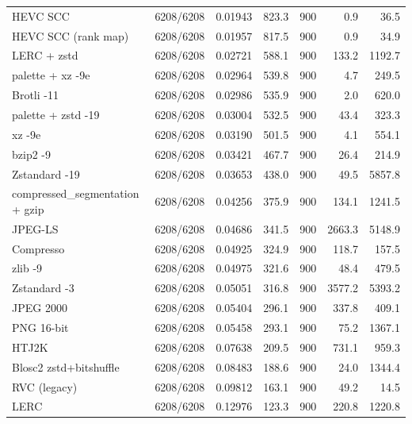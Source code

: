 \begin{table}[t]
\begin{tabular}{lrrrrrr}
HEVC SCC & 6208/6208 & 0.01943 & 823.3 & 900 & 0.9 & 36.5 \\
HEVC SCC (rank map) & 6208/6208 & 0.01957 & 817.5 & 900 & 0.9 & 34.9 \\
LERC + zstd & 6208/6208 & 0.02721 & 588.1 & 900 & 133.2 & 1192.7 \\
palette + xz -9e & 6208/6208 & 0.02964 & 539.8 & 900 & 4.7 & 249.5 \\
Brotli -11 & 6208/6208 & 0.02986 & 535.9 & 900 & 2.0 & 620.0 \\
palette + zstd -19 & 6208/6208 & 0.03004 & 532.5 & 900 & 43.4 & 323.3 \\
xz -9e & 6208/6208 & 0.03190 & 501.5 & 900 & 4.1 & 554.1 \\
bzip2 -9 & 6208/6208 & 0.03421 & 467.7 & 900 & 26.4 & 214.9 \\
Zstandard -19 & 6208/6208 & 0.03653 & 438.0 & 900 & 49.5 & 5857.8 \\
compressed\_segmentation + gzip & 6208/6208 & 0.04256 & 375.9 & 900 & 134.1 & 1241.5 \\
JPEG-LS & 6208/6208 & 0.04686 & 341.5 & 900 & 2663.3 & 5148.9 \\
Compresso & 6208/6208 & 0.04925 & 324.9 & 900 & 118.7 & 157.5 \\
zlib -9 & 6208/6208 & 0.04975 & 321.6 & 900 & 48.4 & 479.5 \\
Zstandard -3 & 6208/6208 & 0.05051 & 316.8 & 900 & 3577.2 & 5393.2 \\
JPEG 2000 & 6208/6208 & 0.05404 & 296.1 & 900 & 337.8 & 409.1 \\
PNG 16-bit & 6208/6208 & 0.05458 & 293.1 & 900 & 75.2 & 1367.1 \\
HTJ2K & 6208/6208 & 0.07638 & 209.5 & 900 & 731.1 & 959.3 \\
Blosc2 zstd+bitshuffle & 6208/6208 & 0.08483 & 188.6 & 900 & 24.0 & 1344.4 \\
RVC (legacy) & 6208/6208 & 0.09812 & 163.1 & 900 & 49.2 & 14.5 \\
LERC & 6208/6208 & 0.12976 & 123.3 & 900 & 220.8 & 1220.8 \\
\hline
\end{tabular}
\end{table}
